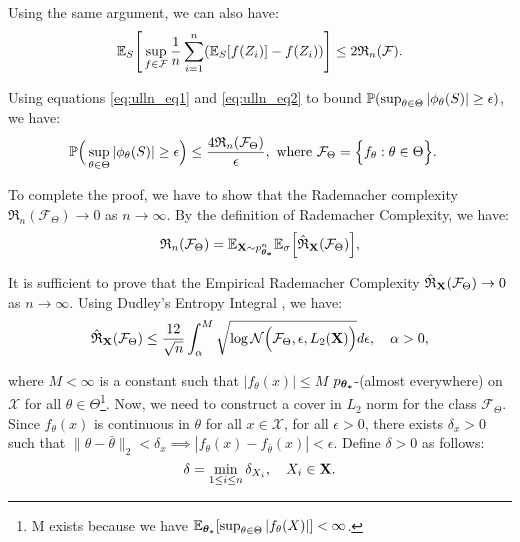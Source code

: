 \begin{proof*}
    \noindent Using the same argument, we can also have:
    \begin{equation}
        \label{eq:ulln_eq2}
         \mathbb{E}_S\Bigg[ \sup_{f\in\mathcal{F}}{\frac{1}{n}\sum_{i=1}^n (\mathbb{E}_S[f(Z_i)] - f(Z_i))} \Bigg] \le 2\mathfrak{R}_n(\mathcal{F}).
    \end{equation}

    \noindent Using equations \ref{eq:ulln_eq1} and \ref{eq:ulln_eq2} to bound $\mathbb{P}(\sup_{\theta\in\Theta}|\phi_\theta(S)|\ge \epsilon)$, we have:
    \begin{align*}
        &\mathbb{P}\Big(\sup_{\theta\in\Theta}|\phi_\theta(S)|\ge \epsilon\Big) \le \frac{4\mathfrak{R}_n(\mathcal{F}_\Theta)}{\epsilon}, 
        \text{ where }\mathcal{F}_\Theta = \Big\{ 
            f_\theta : \theta \in \Theta
         \Big\}.
    \end{align*}

    \noindent To complete the proof, we have to show that the Rademacher complexity $\mathfrak{R}_n(\mathcal{F}_\Theta) \to 0$ as $n\to\infty$. By the definition of Rademacher Complexity, we have:
    \begin{align*}
        \mathfrak{R}_n(\mathcal{F}_\Theta) = \mathbb{E}_{{\bf X}\sim p_{\boldsymbol{\theta_*}}^n} \mathbb{E}_\sigma \Big[ 
            \mathfrak{\hat R}_{\bf X}(\mathcal{F}_\Theta)
         \Big],
    \end{align*}

    \noindent It is sufficient to prove that the Empirical Rademacher Complexity $\mathfrak{\hat R}_{\bf X}(\mathcal{F}_\Theta)\to0$ as $n\to\infty$. Using Dudley's Entropy Integral \cite[Lemma A.5]{article:bartlett2017}, we have:
    \begin{equation}
        \mathfrak{\hat R}_{\bf X}(\mathcal{F}_\Theta) \le \frac{12}{\sqrt n}\int_\alpha^M \sqrt{\log\mathcal{N}\Big( \mathcal{F}_\Theta, \epsilon, L_2({\bf X}) \Big)}d\epsilon, \quad \alpha > 0, 
    \end{equation}

    \noindent where $M<\infty$ is a constant such that $|f_\theta(x)| \le M$ $p_{\boldsymbol{\theta_*}}$-(almost everywhere) on $\mathcal{X}$ for all $\theta\in\Theta$\footnote{M exists because we have $\mathbb{E}_{\boldsymbol{\theta_*}}[\sup_{\theta\in\Theta}|f_\theta(X)|] < \infty$.}. Now, we need to construct a cover in $L_2$ norm for the class $\mathcal{F}_\Theta$. Since $f_\theta(x)$ is continuous in $\theta$ for all $x\in\mathcal{X}$, for all $\epsilon > 0$, there exists $\delta_x>0$ such that $\|\theta - \bar\theta\|_2<\delta_x \implies |f_\theta(x) - f_{\bar\theta}(x)|<\epsilon$. Define $\delta>0$ as follows:
    \begin{equation}
        \delta = \min_{1\le i \le n}\delta_{X_i}, \quad X_i \in {\bf X}.
    \end{equation}


\end{proof*}
